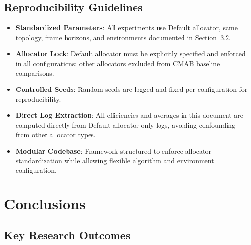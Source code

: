 \documentclass[12pt,a4paper]{article}
\begin{document}
\subsection{Reproducibility Guidelines}

\begin{itemize}
\item \textbf{Standardized Parameters}: All experiments use Default allocator, same topology, frame horizons, and environments documented in Section~3.2.

\item \textbf{Allocator Lock}: Default allocator must be explicitly specified and enforced in all configurations; other allocators excluded from CMAB baseline comparisons.

\item \textbf{Controlled Seeds}: Random seeds are logged and fixed per configuration for reproducibility.

\item \textbf{Direct Log Extraction}: All efficiencies and averages in this document are computed directly from Default-allocator-only logs, avoiding confounding from other allocator types.

\item \textbf{Modular Codebase}: Framework structured to enforce allocator standardization while allowing flexible algorithm and environment configuration.
\end{itemize}

\newpage
\section{Conclusions}

\subsection{Key Research Outcomes}
\end{document}
